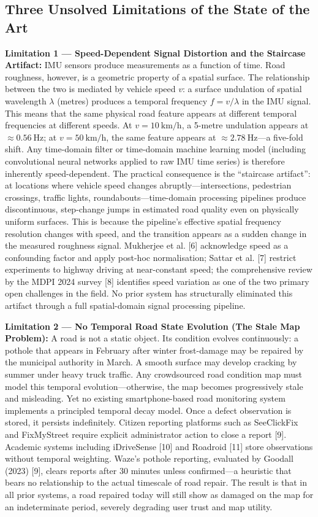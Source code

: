 \documentclass[conference]{IEEEtran}
\begin{document}
\subsection{Three Unsolved Limitations of the State of the Art}

\textbf{Limitation 1 --- Speed-Dependent Signal Distortion and the Staircase Artifact:} IMU sensors produce measurements as a function of time.
Road roughness, however, is a geometric property of a spatial surface.
The relationship between the two is mediated by vehicle speed $v$: a surface undulation of spatial wavelength $\lambda$ (metres) produces a temporal frequency $f = v / \lambda$ in the IMU signal.
This means that the same physical road feature appears at different temporal frequencies at different speeds.
At $v = 10~\text{km/h}$, a 5-metre undulation appears at $\approx 0.56~\text{Hz}$;
at $v = 50~\text{km/h}$, the same feature appears at $\approx 2.78~\text{Hz}$---a five-fold shift.
Any time-domain filter or time-domain machine learning model (including convolutional neural networks applied to raw IMU time series) is therefore inherently speed-dependent.
The practical consequence is the ``staircase artifact'': at locations where vehicle speed changes abruptly---intersections, pedestrian crossings, traffic lights, roundabouts---time-domain processing pipelines produce discontinuous, step-change jumps in estimated road quality even on physically uniform surfaces.
This is because the pipeline's effective spatial frequency resolution changes with speed, and the transition appears as a sudden change in the measured roughness signal.
Mukherjee et al. [6] acknowledge speed as a confounding factor and apply post-hoc normalisation; Sattar et al.
[7] restrict experiments to highway driving at near-constant speed; the comprehensive review by the MDPI 2024 survey [8] identifies speed variation as one of the two primary open challenges in the field.
No prior system has structurally eliminated this artifact through a full spatial-domain signal processing pipeline.

\textbf{Limitation 2 --- No Temporal Road State Evolution (The Stale Map Problem):} A road is not a static object.
Its condition evolves continuously: a pothole that appears in February after winter frost-damage may be repaired by the municipal authority in March.
A smooth surface may develop cracking by summer under heavy truck traffic.
Any crowdsourced road condition map must model this temporal evolution---otherwise, the map becomes progressively stale and misleading.
Yet no existing smartphone-based road monitoring system implements a principled temporal decay model.
Once a defect observation is stored, it persists indefinitely. Citizen reporting platforms such as SeeClickFix and FixMyStreet require explicit administrator action to close a report [9].
Academic systems including iDriveSense [10] and Roadroid [11] store observations without temporal weighting.
Waze's pothole reporting, evaluated by Goodall (2023) [9], clears reports after 30 minutes unless confirmed---a heuristic that bears no relationship to the actual timescale of road repair.
The result is that in all prior systems, a road repaired today will still show as damaged on the map for an indeterminate period, severely degrading user trust and map utility.
\end{document}
